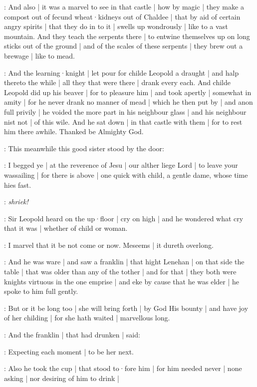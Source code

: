 :
And also |
it was a marvel to see in that castle |
how by magic |
they make a compost out of fecund wheat·kidneys out of Chaldee |
that by aid of certain angry spirits |
that they do in to it |
swells up wondrously |
like to a vast mountain.
And they teach the serpents there |
to entwine themselves up on long sticks out of the ground |
and of the scales of these serpents |
they brew out a brewage |
like to mead.


:
And the learning·knight |
let pour for childe Leopold a draught |
and halp thereto the while |
all they that were there |
drank every each.
And childe Leopold did up his beaver |
for to pleasure him |
and took apertly |
somewhat in amity |
for he never drank no manner of mead |
which he then put by |
and anon full privily |
he voided the more part in his neighbour glass |
and his neighbour nist not |
of this wile.
And he sat down |
in that castle with them |
for to rest him there awhile.
Thanked be Almighty God.



:
This meanwhile this good sister stood by the door:

\nursecallan:
I begged ye |
at the reverence of Jesu |
our alther liege Lord |
to leave your wassailing |
for there is above |
one quick with child,
a gentle dame,
whose time hies fast.

\All:
\emph{shriek!}

:
Sir Leopold heard on the up·floor |
cry on high |
and he wondered what cry that it was |
whether of child or woman.

\Bloom:
I marvel that it be not come or now.
Meseems |
it dureth overlong.

:
And he was ware |
and saw a franklin |
that hight Lenehan |
on that side the table |
that was older than any of the tother |
and for that |
they both were knights virtuous in the one emprise |
and eke by cause that he was elder |
he spoke to him full gently.

\Bloom:
But or it be long too |
she will bring forth |
by God His bounty |
and have joy of her childing |
for she hath waited |
marvellous long.

:
And the franklin |
that had drunken |
said:

\lenehan:
Expecting each moment |
to be her next.

:
Also he took the cup |
that stood to·fore him |
for him needed never |
none asking |
nor desiring of him to drink |

